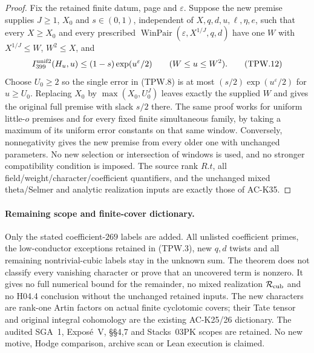 \begin{proof}
Fix the retained finite datum, page and $\varepsilon$.
Suppose the new premise supplies $J\geq1$, $X_0$ and $s\in(0,1)$,
independent of $X,q,d,u,\ell,\eta,e$, such that every $X\geq X_0$
and every prescribed $\operatorname{WinPair}(\varepsilon,X^{1/J},q,d)$
have one $W$ with $X^{1/J}\leq W$, $W^2\leq X$, and
\[
 I_{399}^{\rm unif2}(H_u,u)\leq(1-s)\exp(u^\varepsilon/2)
                       \qquad(W\leq u\leq W^2).
 \tag{TPW.12}
\]
Choose $U_0\geq2$ so the single error in (TPW.8) is at most
$(s/2)\exp(u^\varepsilon/2)$ for $u\geq U_0$.
Replacing $X_0$ by $\max(X_0,U_0^J)$ leaves exactly the supplied $W$
and gives the original full premise with slack $s/2$ there.
The same proof works for uniform little-$o$ premises and for every
fixed finite simultaneous family, by taking a maximum of its uniform
error constants on that same window.
Conversely, nonnegativity gives the new premise from every older one
with unchanged parameters.  No new selection or intersection of windows
is used, and no stronger compatibility condition is imposed.
The source rank $R.t$, all field/weight/character/coefficient quantifiers,
and the unchanged mixed theta/Selmer and analytic realization inputs
are exactly those of AC-K35.
\end{proof}

\paragraph{Remaining scope and finite-cover dictionary.}
Only the stated coefficient-$269$ labels are added.
All unlisted coefficient primes, the low-conductor exceptions retained
in (TPW.3), new $q,d$ twists and all remaining nontrivial-cubic labels
stay in the unknown sum.  The theorem does not classify every vanishing
character or prove that an uncovered term is nonzero.
It gives no full numerical bound for the remainder,
no mixed realization $\mathcal R_{\rm cub}$ and no H04.4 conclusion
without the unchanged retained inputs.
The new characters are rank-one Artin factors on actual finite
cyclotomic covers; their Tate tensor and original integral cohomology
are the existing AC-K25/26 dictionary.  The audited SGA~1,
Expos\'e~V, \S\S4,7 and Stacks~03PK scopes are retained.
No new motive, Hodge comparison, archive scan or Lean execution is claimed.
